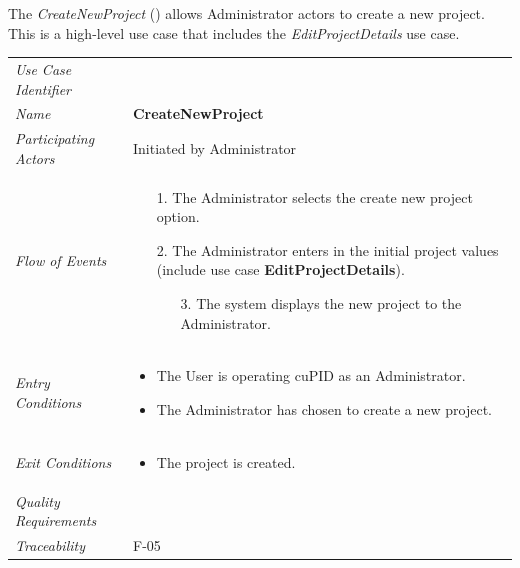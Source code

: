 \documentclass[12pt,letterpaper]{article}
\begin{document}
The {\it CreateNewProject} () allows Administrator actors to create a new project. This is a high-level use case that includes the {\it EditProjectDetails} use case.

\begin{center}
	\begin{tabu} to 
		\toprule
		Use Case Identifier &  \\
		Name & {\bf CreateNewProject} \\
		Participating Actors & Initiated by Administrator \\
		Flow of Events & 
		\begin{minipage}[t]{\linewidth}
		    \begin{enumerate}
			    \item[1.] The Administrator selects the create new project option.
			    \item[2.] The Administrator enters in the initial project values (include use case \textbf{EditProjectDetails}).
			    \begin{enumerate}
				    \item[3.] The system displays the new project to the Administrator.
				\end{enumerate}
		    \end{enumerate}
	    \end{minipage} \\

		Entry Conditions &
		\begin{minipage}[t]{\linewidth}
			\begin{itemize}
			    \item The User is operating cuPID as an Administrator.
			    \item The Administrator has chosen to create a new project.
	        \end{itemize}
	    \end{minipage} \\

		Exit Conditions & 
		\begin{minipage}[t]{\linewidth}
			\begin{itemize}
			    \item The project is created.
	        \end{itemize}
	    \end{minipage}\\

		Quality Requirements & \\

		Traceability & F-05 \\
		\toprule
	\end{tabu}
\end{center}
\end{document}
